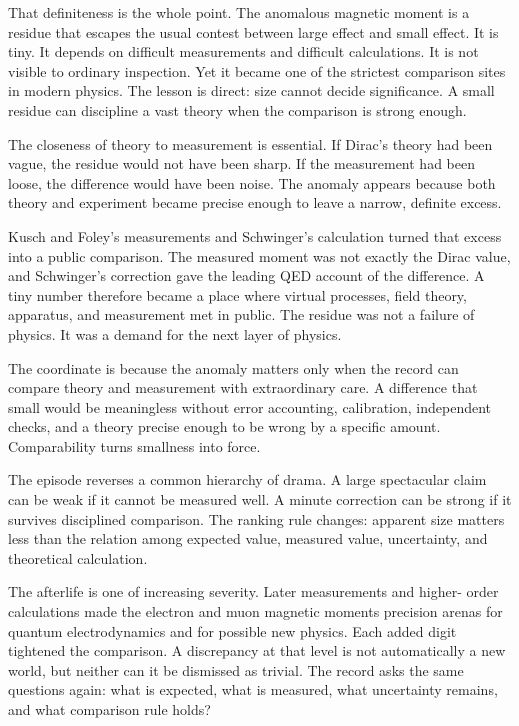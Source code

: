 That definiteness is the whole point. The anomalous magnetic moment is a
residue that escapes the usual contest between large effect and small effect.
It is tiny. It depends on difficult measurements and difficult calculations.
It is not visible to ordinary inspection. Yet it became one of the strictest
comparison sites in modern physics. The lesson is direct: size cannot decide
significance. A small residue can discipline a vast theory when the
comparison is strong enough.

The closeness of theory to measurement is essential. If Dirac's theory had
been vague, the residue would not have been sharp. If the measurement had
been loose, the difference would have been noise. The anomaly appears because
both theory and experiment became precise enough to leave a narrow, definite
excess.

Kusch and Foley's measurements and Schwinger's calculation turned that excess
into a public comparison. The measured moment was not exactly the Dirac value,
and Schwinger's correction gave the leading QED account of the difference. A
tiny number therefore became a place where virtual processes, field theory,
apparatus, and measurement met in public. The residue was not a failure of
physics. It was a demand for the next layer of physics.

The coordinate is  because the anomaly matters only when the
record can compare theory and measurement with extraordinary care. A
difference that small would be meaningless without error accounting,
calibration, independent checks, and a theory precise enough to be wrong by a
specific amount. Comparability turns smallness into force.

The episode reverses a common hierarchy of drama. A large spectacular claim
can be weak if it cannot be measured well. A minute correction can be strong
if it survives disciplined comparison. The ranking rule changes: apparent
size matters less than the relation among expected value, measured value,
uncertainty, and theoretical calculation.

The afterlife is one of increasing severity. Later measurements and higher-
order calculations made the electron and muon magnetic moments precision
arenas for quantum electrodynamics and for possible new physics. Each added
digit tightened the comparison. A discrepancy at that level is not
automatically a new world, but neither can it be dismissed as trivial. The
record asks the same questions again: what is expected, what is measured,
what uncertainty remains, and what comparison rule holds?

